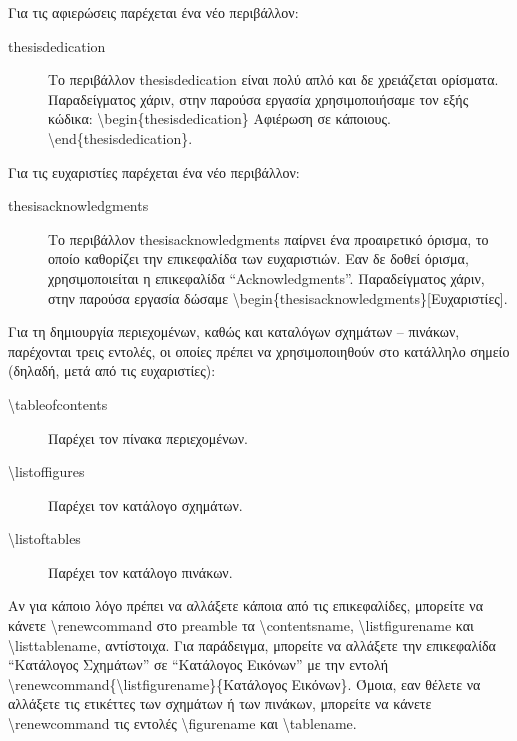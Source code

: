 \documentclass{dithesis}
\begin{document}
    Για τις αφιερώσεις παρέχεται ένα νέο περιβάλλον:
    \begin{description}
    \item[thesisdedication]
      Το περιβάλλον thesisdedication είναι πολύ απλό και δε χρειάζεται ορίσματα.
      Παραδείγματος χάριν, στην παρούσα εργασία χρησιμοποιήσαμε τον εξής κώδικα:
      \textbackslash{begin}\{thesisdedication\} Αφιέρωση σε κάποιους.
      \textbackslash{end}\{thesisdedication\}.
    \end{description}

    Για τις ευχαριστίες παρέχεται ένα νέο περιβάλλον:
    \begin{description}
    \item[thesisacknowledgments]
      Το περιβάλλον thesisacknowledgments παίρνει ένα προαιρετικό όρισμα, το οποίο 
      καθορίζει την επικεφαλίδα των ευχαριστιών.
      Εαν δε δοθεί όρισμα, χρησιμοποιείται η επικεφαλίδα ``Acknowledgments''.
      Παραδείγματος χάριν, στην παρούσα εργασία δώσαμε
      \textbackslash{begin}\{thesisacknowledgments\}{[Ευχαριστίες]}.
    \end{description}

    Για τη δημιουργία περιεχομένων, καθώς και καταλόγων σχημάτων -- πινάκων,
    παρέχονται τρεις εντολές, οι οποίες πρέπει να χρησιμοποιηθούν στο κατάλληλο
    σημείο (δηλαδή, μετά από τις ευχαριστίες):
    \begin{description}
    \item[\textbackslash{tableofcontents}]
      Παρέχει τον πίνακα περιεχομένων.
    \item[\textbackslash{listoffigures}]
      Παρέχει τον κατάλογο σχημάτων.
    \item[\textbackslash{listoftables}]
      Παρέχει τον κατάλογο πινάκων.
    \end{description}

    Αν για κάποιο λόγο πρέπει να αλλάξετε κάποια από τις επικεφαλίδες, μπορείτε να
    κάνετε \textbackslash{renewcommand} στο preamble τα 
    \textbackslash{contentsname}, \textbackslash{listfigurename} και 
    \textbackslash{listtablename}, αντίστοιχα.
    Για παράδειγμα, μπορείτε να αλλάξετε την επικεφαλίδα ``Κατάλογος Σχημάτων'' σε
    ``Κατάλογος Εικόνων'' με την εντολή 
    \textbackslash{renewcommand}\{\textbackslash{listfigurename}\}\{Κατάλογος
    Εικόνων\}.
    Όμοια, εαν θέλετε να αλλάξετε τις ετικέττες των σχημάτων ή των πινάκων, μπορείτε
    να κάνετε \textbackslash{renewcommand} τις εντολές \textbackslash{figurename}
    και \textbackslash{tablename}.
\end{document}
